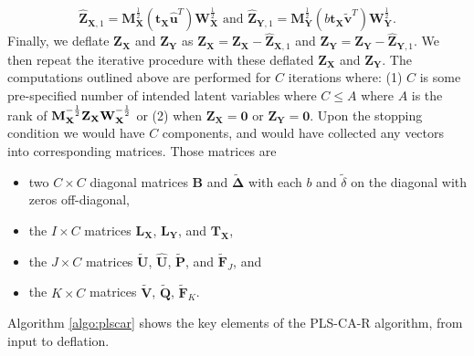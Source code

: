 \documentclass[12pt]{article}
\begin{document}
\begin{equation}
\widehat{\mathbf Z}_{{\mathbf X},1} = {\mathbf M}_{\mathbf X}^{\frac{1}{2}}({\mathbf t}_{\mathbf X}\widehat{\mathbf u}^{T}){\mathbf W}_{\mathbf X}^{\frac{1}{2}} \text{ and } \widehat{\mathbf Z}_{{\mathbf Y},1} = {\mathbf M}_{\mathbf Y}^{\frac{1}{2}}(b{\mathbf t}_{\mathbf X}\widetilde{\mathbf v}^{T}){\mathbf W}_{\mathbf Y}^{\frac{1}{2}}.
\label{eq:rank1_preds_plscar}
\end{equation} Finally, we deflate \({\mathbf Z}_{\mathbf X}\) and
\({\mathbf Z}_{\mathbf Y}\) as
\({\mathbf Z}_{\mathbf X} = {\mathbf Z}_{\mathbf X} - \widehat{\mathbf Z}_{{\mathbf X},1}\)
and
\({\mathbf Z}_{\mathbf Y} = {\mathbf Z}_{\mathbf Y} - \widehat{\mathbf Z}_{{\mathbf Y},1}\).
We then repeat the iterative procedure with these deflated
\({\mathbf Z}_{\mathbf X}\) and \({\mathbf Z}_{\mathbf Y}\). The
computations outlined above are performed for \(C\) iterations where:
(1) \(C\) is some pre-specified number of intended latent variables
where \(C \leq A\) where \(A\) is the rank of
\({\bf M}_{\bf X}^{-\frac{1}{2}}{\mathbf Z}_{\mathbf X}{\bf W}_{\bf X}^{-\frac{1}{2}}\)
or (2) when \({\mathbf Z}_{\mathbf X} = {\mathbf 0}\) or
\({\mathbf Z}_{\mathbf Y} = {\mathbf 0}\). Upon the stopping condition
we would have \(C\) components, and would have collected any vectors
into corresponding matrices. Those matrices are

\begin{itemize}
\item
  two \(C \times C\) diagonal matrices \({\mathbf B}\) and
  \(\widetilde{\boldsymbol \Delta}\) with each \(b\) and
  \(\tilde\delta\) on the diagonal with zeros off-diagonal,
\item
  the \(I \times C\) matrices \({\mathbf L}_{\mathbf X}\),
  \({\mathbf L}_{\mathbf Y}\), and \({\mathbf T}_{\mathbf X}\),
\item
  the \(J \times C\) matrices \(\widetilde{\mathbf U}\),
  \(\widehat{\mathbf U}\), \(\widetilde{\mathbf P}\), and
  \(\widetilde{\mathbf F}_{J}\), and
\item
  the \(K \times C\) matrices \(\widetilde{\mathbf V}\),
  \(\widetilde{\mathbf Q}\), \(\widetilde{\mathbf F}_{K}\).
\end{itemize}

Algorithm \ref{algo:plscar} shows the key elements of the PLS-CA-R
algorithm, from input to deflation.
\end{document}
